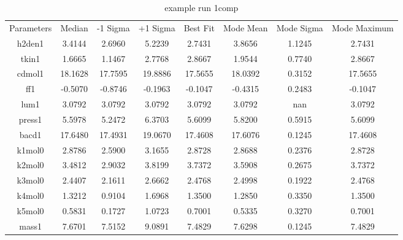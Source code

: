 \begin{table}
\caption{example run 1comp}
\begin{tabular}{cccccccc}
Parameters & Median & -1 Sigma & +1 Sigma & Best Fit & Mode Mean & Mode Sigma & Mode Maximum \\
h2den1 & 3.4144 & 2.6960 & 5.2239 & 2.7431 & 3.8656 & 1.1245 & 2.7431 \\
tkin1 & 1.6665 & 1.1467 & 2.7768 & 2.8667 & 1.9544 & 0.7740 & 2.8667 \\
cdmol1 & 18.1628 & 17.7595 & 19.8886 & 17.5655 & 18.0392 & 0.3152 & 17.5655 \\
ff1 & -0.5070 & -0.8746 & -0.1963 & -0.1047 & -0.4315 & 0.2483 & -0.1047 \\
lum1 & 3.0792 & 3.0792 & 3.0792 & 3.0792 & 3.0792 & nan & 3.0792 \\
press1 & 5.5978 & 5.2472 & 6.3703 & 5.6099 & 5.8200 & 0.5915 & 5.6099 \\
bacd1 & 17.6480 & 17.4931 & 19.0670 & 17.4608 & 17.6076 & 0.1245 & 17.4608 \\
k1mol0 & 2.8786 & 2.5900 & 3.1655 & 2.8728 & 2.8688 & 0.2376 & 2.8728 \\
k2mol0 & 3.4812 & 2.9032 & 3.8199 & 3.7372 & 3.5908 & 0.2675 & 3.7372 \\
k3mol0 & 2.4407 & 2.1611 & 2.6662 & 2.4768 & 2.4998 & 0.1922 & 2.4768 \\
k4mol0 & 1.3212 & 0.9104 & 1.6968 & 1.3500 & 1.2850 & 0.3350 & 1.3500 \\
k5mol0 & 0.5831 & 0.1727 & 1.0723 & 0.7001 & 0.5335 & 0.3270 & 0.7001 \\
mass1 & 7.6701 & 7.5152 & 9.0891 & 7.4829 & 7.6298 & 0.1245 & 7.4829 \\
\end{tabular}
\end{table}
